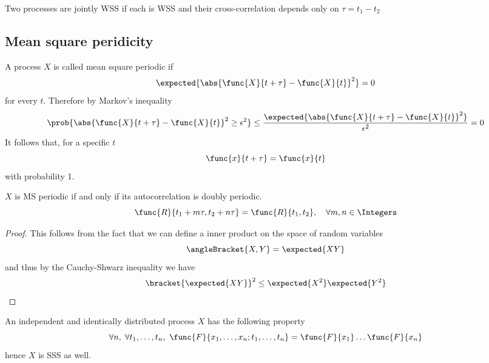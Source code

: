 Two processes are jointly WSS if each is WSS and their cross-correlation depends only on \(\tau = t_1 - t_2\)

\subsection{Mean square peridicity}
A process \(X\) is called mean square periodic if 
\begin{equation*}
    \expected{\abs{\func{X}{t + \tau} - \func{X}{t}}^2} = 0
\end{equation*}
for every \(t\). Therefore by Markov's inequality
\begin{equation*}
    \prob{\abs{\func{X}{t + \tau} - \func{X}{t}}^2 \geq \epsilon^2} \leq \dfrac{\expected{\abs{\func{X}{t + \tau} - \func{X}{t}}^2}}{\epsilon^2} = 0
\end{equation*}
It follows that, for a specific \(t\)
\begin{equation*}
    \func{x}{t + \tau} = \func{x}{t}
\end{equation*}
with probability 1.
\begin{proposition}
    \(X\) is MS periodic if and only if its autocorrelation is doubly periodic.
    \begin{equation*}
        \func{R}{t_1 + m\tau, t_2 + n\tau} = \func{R}{t_1,t_2}, \quad \forall m,n \in \Integers
    \end{equation*}
\end{proposition}
\begin{proof}
    This follows from the fact that we can define a inner product on the space of random variables 
    \begin{equation*}
        \angleBracket{X,Y} = \expected{XY}
    \end{equation*}
    and thus by the Cauchy-Shwarz inequality we have 
    \begin{equation*}
        \bracket{\expected{XY}}^2 \leq \expected{X^2} \expected{Y^2}
    \end{equation*}
\end{proof}

\begin{definition}
    An independent and identically distributed process \(X\) has the following property
    \begin{equation*}
        \forall n, \; \forall t_1, \dots, t_n, \ \func{F}{x_1, \dots ,x_n ; t_1, \dots , t_n} = \func{F}{x_1} \dots \func{F}{x_n}
    \end{equation*}
    hence \(X\) is SSS as well.
\end{definition}

